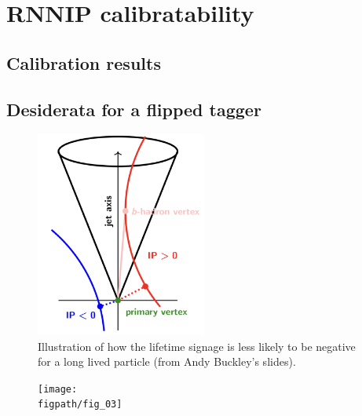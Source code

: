 \section{RNNIP calibratability}
\label{d1r-calibration}

\subsection{Calibration results}

\def\figpath{figures/ftag/DL1r-calibration}

\begin{figure}[htbp]
    \centering
    \caption{}
    \label{fig:pflow-calib}
\end{figure}

\subsection{Desiderata for a flipped tagger}

\begin{figure}[htbp]
  \centering
 \includegraphics[width=0.5\textwidth]{figures/ftag/fipped-tagger-graphic}
 \caption{Illustration of how the lifetime signage is less likely to be negative for a long lived particle (from Andy Buckley's slides).}
 \label{fig:lifetime-signage}
\end{figure}


\begin{figure}[htbp]
    \centering
    \texttt{[image: \\figpath/fig\_03]}
    \caption{}
    \label{fig:pflow-calib-light}
\end{figure}